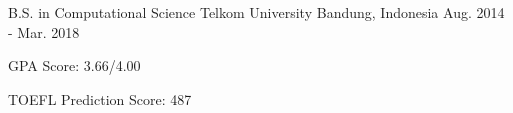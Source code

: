 \begin{cventries}

  \cventry
    {B.S. in Computational Science} %
    {Telkom University} %
    {Bandung, Indonesia} %
    {Aug. 2014 - Mar. 2018} %
    {
      \begin{cvitems} %
        \item {GPA Score: 3.66/4.00}
        \item {TOEFL Prediction Score: 487}
      \end{cvitems}
    }

\end{cventries}
